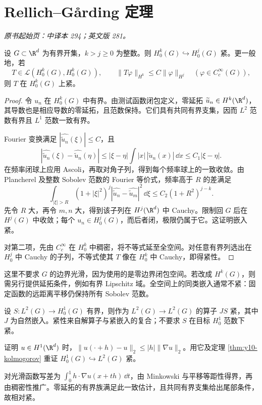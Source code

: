 \section{Rellich--Gårding 定理}\label{sec:yosida-10-03}
\noindent\textit{原书起始页：中译本 294；英文版 281。}

\begin{theorem}\label{thm:y10-rellich}
设 $G\subset\R^d$ 为有界开集，$k>j\ge0$ 为整数。则 $H_0^k(G)\hookrightarrow H_0^j(G)$ 紧。更一般地，若
\[
 T\in\mathcal L(H_0^k(G),H_0^k(G)),\qquad
 \|T\varphi\|_{H^k}\le C\|\varphi\|_{H^j}
 \quad(\varphi\in C_c^\infty(G)),
\]
则 $T$ 在 $H_0^k(G)$ 上紧。
\end{theorem}
\begin{proof}
令 $u_n$ 在 $H_0^k(G)$ 中有界。由测试函数闭包定义，零延拓 $\widetilde u_n\in H^k(\R^d)$，其导数也是相应导数的零延拓，且范数保持。它们具有共同有界支集，因而 $L^2$ 范数有界且 $L^1$ 范数一致有界。

Fourier 变换满足 $|\widehat {\widetilde u_n}(\xi)|\le C$，且
\[
 |\widehat {\widetilde u_n}(\xi)-\widehat {\widetilde u_n}(\eta)|
 \le |\xi-\eta|\int|x|\,|\widetilde u_n(x)|\,\dd x\le C_1|\xi-\eta|.
\]
在频率闭球上应用 Ascoli，再取对角子列，得到每个频率球上的一致收敛。由 Plancherel 及整数 Sobolev 范数的 Fourier 等价式，频率高于 $R$ 的差满足
\[
 \int_{|\xi|>R}(1+|\xi|^2)^j
 |\widehat {\widetilde u_n}-\widehat {\widetilde u_m}|^2\,\dd\xi
 \le C_2(1+R^2)^{j-k}.
\]
先令 $R$ 大，再令 $m,n$ 大，得到该子列在 $H^j(\R^d)$ 中 Cauchy。限制回 $G$ 后在 $H^j(G)$ 中收敛；每个 $u_n\in H_0^j(G)$，而后者闭，极限仍属于它。这证明嵌入紧。

对第二项，先由 $C_c^\infty$ 在 $H_0^k$ 中稠密，将不等式延至全空间。对任意有界列选出在 $H_0^j$ 中 Cauchy 的子列，不等式使其 $T$ 像在 $H_0^k$ 中 Cauchy，即得紧性。
\end{proof}

这里不要求 $G$ 的边界光滑，因为使用的是零边界闭包空间。若改成 $H^k(G)$，则需另行提供延拓条件，例如有界 Lipschitz 域。全空间上的同类嵌入通常不紧：固定函数的远距离平移仍保持所有 Sobolev 范数。

\begin{example}[正则性如何产生紧性]
设 $S:L^2(G)\to H_0^1(G)$ 有界，则作为 $L^2(G)\to L^2(G)$ 的算子 $JS$ 紧，其中 $J$ 为自然嵌入。紧性来自解算子与紧嵌入的复合；不要求 $S$ 在目标 $H_0^1$ 范数下紧。
\end{example}

\begin{exercise}[平移估计的另一条证明]\label{ex:y10-translation-estimate}
证明 $u\in H^1(\R^d)$ 时，$\|u(\cdot+h)-u\|_2\le |h|\|\nabla u\|_2$。用它及定理 \ref{thm:y10-kolmogorov} 重证 $H_0^1(G)\hookrightarrow L^2(G)$ 紧。
\end{exercise}
\begin{solution}
对光滑函数写差为 $\int_0^1h\cdot\nabla u(x+th)\,\dd t$，由 Minkowski 与平移等距性得界，再由稠密性推广。零延拓的有界族满足此一致估计，且共同有界支集给出尾部条件，故相对紧。
\end{solution}

